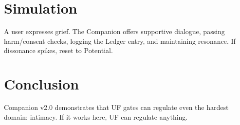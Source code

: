 \documentclass[11pt]{article}
\begin{document}
\section{Simulation}
A user expresses grief. The Companion offers supportive dialogue, passing harm/consent checks, logging the Ledger entry, and maintaining resonance. 
If dissonance spikes, reset to Potential.

\section{Conclusion}
Companion v2.0 demonstrates that UF gates can regulate even the hardest domain: intimacy. 
If it works here, UF can regulate anything.
\end{document}
